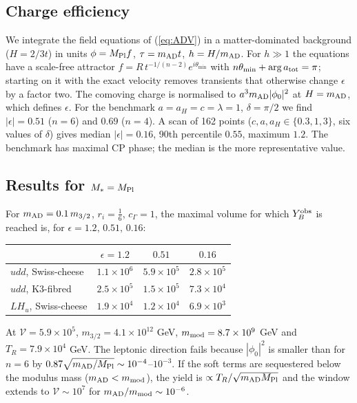 \documentclass[11pt]{article}
\newcommand{\Mpl}{M_{\rm Pl}}
\newcommand{\vol}{\mathcal{V}}
\begin{document}
\subsection{Charge efficiency}
We integrate the field equations of (\ref{eq:ADV}) in a matter-dominated background ($H=2/3t$) in units $\phi=\Mpl f$, $\tau=m_{\rm AD}t$, $h=H/m_{\rm AD}$. For $h\gg1$ the equations have a scale-free attractor $f=R\,t^{-1/(n-2)}e^{i\theta_{\min}}$ with $n\theta_{\min}+\arg a_{\rm tot}=\pi$; starting on it with the exact velocity removes transients that otherwise change $\epsilon$ by a factor two. The comoving charge is normalised to $a^3m_{\rm AD}|\phi_0|^2$ at $H=m_{\rm AD}$, which defines $\epsilon$. For the benchmark $a=a_H=c=\lambda=1$, $\delta=\pi/2$ we find $|\epsilon|=0.51$ ($n=6$) and $0.69$ ($n=4$). A scan of 162 points ($c,a,a_H\in\{0.3,1,3\}$, six values of $\delta$) gives median $|\epsilon|=0.16$, 90th percentile $0.55$, maximum $1.2$. The benchmark has maximal CP phase; the median is the more representative value.

\subsection{Results for $M_*=\Mpl$}
For $m_{\rm AD}=0.1\,m_{3/2}$, $r_i=\tfrac16$, $c_\Gamma=1$, the maximal volume for which $Y_B^{\rm obs}$ is reached is, for $\epsilon=1.2,\,0.51,\,0.16$:
\begin{center}\begin{tabular}{lccc}\toprule
 & $\epsilon=1.2$ & $0.51$ & $0.16$\\ \midrule
$udd$, Swiss-cheese & $1.1\times10^6$ & $5.9\times10^5$ & $2.8\times10^5$\\
$udd$, K3-fibred & $2.5\times10^5$ & $1.5\times10^5$ & $7.3\times10^4$\\
$LH_u$, Swiss-cheese & $1.9\times10^4$ & $1.2\times10^4$ & $6.9\times10^3$\\ \bottomrule
\end{tabular}\end{center}
At $\vol=5.9\times10^5$, $m_{3/2}=4.1\times10^{12}$ GeV, $m_{\rm mod}=8.7\times10^9$ GeV and $T_R=7.9\times10^4$ GeV. The leptonic direction fails because $|\phi_0|^2$ is smaller than for $n=6$ by $0.87\sqrt{m_{\rm AD}/\Mpl}\sim10^{-4}$--$10^{-3}$. If the soft terms are sequestered below the modulus mass ($m_{\rm AD}<m_{\rm mod}$), the yield is $\propto T_R/\sqrt{m_{\rm AD}\Mpl}$ and the window extends to $\vol\sim10^7$ for $m_{\rm AD}/m_{\rm mod}\sim10^{-6}$.
\end{document}
